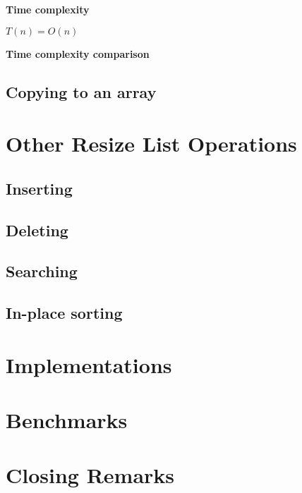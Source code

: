 \documentclass{article}
\newcommand{\tcomplex}{\textbf{Time complexity}}
\newcommand{\tcomplexcmp}{\textbf{Time complexity comparison}}
\newcommand{\timefn}{T}
\newcommand{\bigo}{O}
\newcommand{\varnitems}{n}
\begin{document}
	\tcomplex
	
	$\timefn(\varnitems) = \bigo(\varnitems)$
	
	\tcomplexcmp
	
	\subsection{Copying to an array}
	
	\section{Other Resize List Operations}
	
	\subsection{Inserting}
	
	\subsection{Deleting}
	
	\subsection{Searching}
	
	\subsection{In-place sorting}
	
	\section{Implementations}
	
	\section{Benchmarks}
	
	\section{Closing Remarks}
\end{document}
